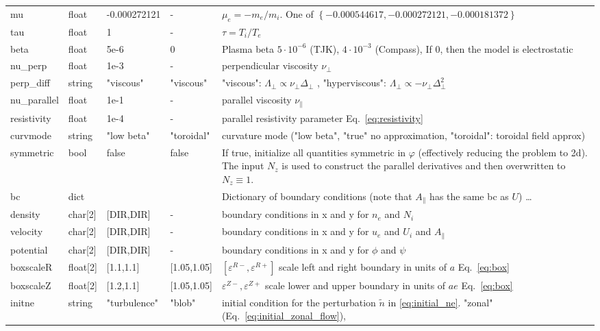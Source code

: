 \begin{longtable}{llll>{\RaggedRight}p{6cm}}
mu         & float & -0.000272121& - & $\mu_e =-m_e/m_i$.
    One of $\left\{ -0.000544617, -0.000272121, -0.000181372 \right\}$\\
tau        & float &1      & - & $\tau = T_i/T_e$  \\
beta       & float & 5e-6  & 0 & Plasma beta $5\cdot 10^{-6}$ (TJK), $4\cdot 10^{-3}$ (Compass), If $0$, then the model is electrostatic \\
nu\_perp   & float &1e-3   & - & perpendicular viscosity $\nu_\perp$ \\
perp\_diff & string & "viscous" & "viscous" & "viscous": $\Lambda_\perp\propto \nu_\perp\Delta_\perp$ , "hyperviscous": $\Lambda_\perp \propto -\nu_\perp\Delta_\perp^2$\\
nu\_parallel & float &1e-1 & - & parallel viscosity $\nu_\parallel$ \\
resistivity & float &1e-4  & - & parallel resistivity parameter Eq.~\eqref{eq:resistivity}\\
curvmode  & string & "low beta"  & "toroidal"& curvature mode ("low beta", "true" no approximation, "toroidal": toroidal field approx) \\
symmetric & bool & false & false & If true, initialize all quantities symmetric in $\varphi$ (effectively reducing the problem to 2d). The input $N_z$ is used to construct the parallel derivatives and then overwritten to $N_z\equiv 1$. \\
bc & dict & & & Dictionary of boundary conditions (note that $A_\parallel$ has the same bc as $U$) \ldots\\
\qquad density   & char[2] & [DIR,DIR] & -  & boundary conditions in x and y for $n_e$ and $N_i$\\
\qquad velocity  & char[2] & [DIR,DIR] & - & boundary conditions in x and y for $u_e$ and $U_i$ and $A_\parallel$\\
\qquad potential & char[2] & [DIR,DIR] & - & boundary conditions in x and y for $\phi$ and $\psi$\\
    boxscaleR  & float[2] & [1.1,1.1]     & [1.05,1.05] & $[\varepsilon^{R-}, \varepsilon^{R+}]$ scale left and right boundary in units of $a$ Eq.~\eqref{eq:box}\\
    boxscaleZ  & float[2] & [1.2,1.1]     & [1.05,1.05] & $\varepsilon^{Z-}, \varepsilon^{Z+}$ scale lower and upper boundary in units of $ae$ Eq.~\eqref{eq:box} \\
initne    & string & "turbulence"     & "blob"  & initial condition for the
perturbation $\tilde n$ in \eqref{eq:initial_ne}. "zonal" (Eq.~\eqref{eq:initial_zonal_flow}),

\end{longtable}
